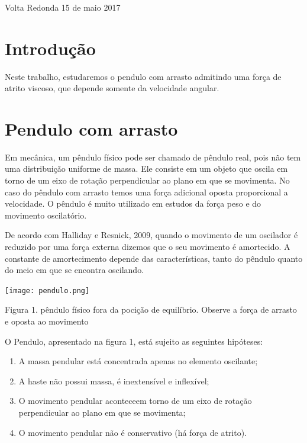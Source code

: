 \documentclass[a4paper]{article} %
\begin{document}
\begin{center}
	\
\end{center}
\begin{center}
	\
\end{center}
\begin{center}
	\
\end{center}
\begin{center}
	Volta Redonda 15 de maio 2017\eject 
	
\end{center}

\setcounter{secnumdepth}{0}
\section{Introdu\c{c}\~{a}o}
\noindent

Neste trabalho, estudaremos o pendulo com arrasto admitindo uma for\c{c}a de atrito viscoso, que depende somente da velocidade angular. 
\noindent \eject 

\section{Pendulo com arrasto}
\noindent 

Em mec\^anica, um p\^endulo f\'isico pode ser chamado de p\^endulo real, pois n\~ao tem uma distribui\c{c}\~ao uniforme de massa. Ele consiste em um objeto que oscila em torno de um eixo de rota\c{c}\~ao perpendicular ao plano em que se movimenta. No caso do p\^endulo com arrasto temos uma for\c{c}a adicional oposta proporcional a velocidade. O p\^endulo \'e muito utilizado em estudos da for\c{c}a peso e do movimento oscilat\'orio.

De acordo com Halliday e Resnick, 2009, quando o movimento de um oscilador \'e reduzido por uma for\c{c}a externa dizemos que o seu movimento \'e amortecido. A constante de amortecimento depende das caracter\'isticas, tanto do p\^endulo quanto do meio em que se encontra oscilando.

\begin{center}
	\texttt{[image: pendulo.png]}
	
	\scriptsize Figura 1. p\^endulo f\'isico fora da poci\c{c}\~ao de equil\'ibrio. Observe a for\c{c}a de arrasto e oposta ao movimento
	
\end{center}

O Pendulo, apresentado na figura 1, est\'a sujeito as seguintes hip\'oteses:
\begin{enumerate}
\item A massa pendular est\'a concentrada apenas no elemento oscilante;
\item A haste n\~ao possui massa, \'e inextens\'ivel e inflex\'ivel;
\item O movimento pendular aconteceem torno de um eixo de rota\c{c}\~ao perpendicular ao plano em que se movimenta;
\item O movimento pendular n\~ao \'e conservativo (h\'a for\c{c}a de atrito).
\end{enumerate}
\end{document}
